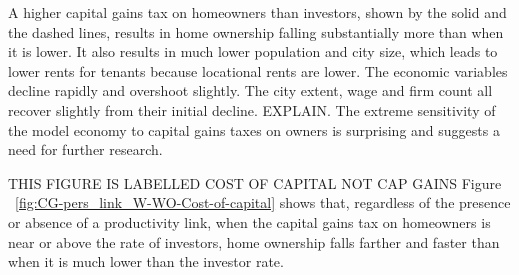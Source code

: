 A higher capital gains tax on homeowners than investors, shown by the solid and the dashed lines, results in home ownership falling substantially more than when it is lower. It also results in much lower population and city size, which leads to lower rents for tenants because locational rents are lower.
The economic variables decline rapidly and overshoot slightly. The city extent, wage and firm count all recover slightly from their initial decline. {\color{red} EXPLAIN.} 
The extreme sensitivity of the model economy to capital gains taxes on owners is surprising and suggests a need for further research. 








{\color{red} THIS FIGURE IS LABELLED COST OF CAPITAL NOT CAP GAINS Figure ~\ref{fig:CG-pers_link_W-WO-Cost-of-capital} } shows that, regardless of the presence or absence of a productivity link, when the capital gains tax on homeowners is near or above the rate of investors, %
home ownership falls farther and faster than when it is much lower than the investor rate. 




